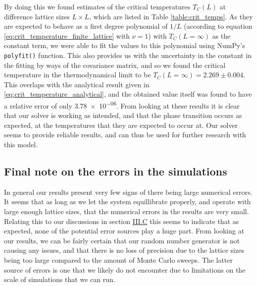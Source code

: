 \documentclass[reprint,english,notitlepage]{revtex4-1}  %
\begin{document}
By doing this we found estimates of the critical temperatures $T_C(L)$ at difference lattice sizes $L \times L$, which are listed in Table \ref{table:crit_temps}. As they are expected to behave as a first degree polynomial of $1/L$ (according to equation \eqref{eq:crit_temperature_finite_lattice} with $\nu=1$) with $T_C(L=\infty)$ as the constant term, we were able to fit the values to this polynomial using NumPy's \verb+polyfit()+ function. This also provides us with the uncertainty in the constant in the fitting by ways of the covariance matrix, and so we found the critical temperature in the thermodynamical limit to be $T_C(L=\infty) = 2.269 \pm 0.004$. This overlaps with the analytical result given in \eqref{eq:crit_temperature_analytical}, and the obtained value itself was found to have a relative error of only \num{3.78e-06}. From looking at these results it is clear that our solver is working as intended, and that the phase transition occurs as expected, at the temperatures that they are expected to occur at. Our solver seems to provide reliable results, and can thus be used for further research with this model. 


\subsection{Final note on the errors in the simulations} \label{sec:V:E}

In general our results present very few signs of there being large numerical errors. It seems that as long as we let the system equillibrate properly, and operate with large enough lattice sizes, that the numerical errors in the results are very small. Relating this to our discussions in section \hyperref[sec:III:C]{III.C} this seems to indicate that as expected, none of the potential error sources play a huge part. From looking at our results, we can be fairly certain that our random number generator is not causing any issues, and that there is no loss of precision due to the lattice sizes being too large compared to the amount of Monte Carlo sweeps. The latter source of errors is one that we likely do not encounter due to limitations on the scale of simulations that we can run. 
\end{document}
